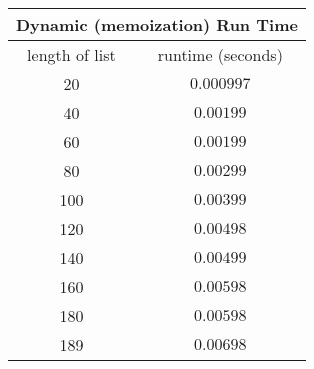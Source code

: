\begin{tabular}{c|c}
    \hline
    \multicolumn{2}{|c|}{Dynamic (memoization) Run Time} \\
    \hline
    length of list & runtime (seconds)                   \\
    \hline
    20             & $0.000997$                          \\
    40             & $0.00199$                           \\
    60             & $0.00199$                           \\
    80             & $0.00299$                           \\
    100            & $0.00399$                           \\
    120            & $0.00498$                           \\
    140            & $0.00499$                           \\
    160            & $0.00598$                           \\
    180            & $0.00598$                           \\
    189            & $0.00698$                           \\
    \hline
\end{tabular}
